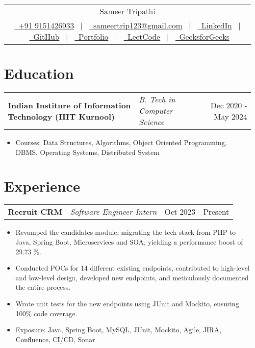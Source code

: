 \documentclass[a4paper,10pt]{article}
\makeatletter
\newenvironment{joblong}[3]
    {
    \begin{tabularx}{\linewidth}{@{}l X r@{}}
    \textbf{#1} & \textit{#2} &  #3 \\[3pt]
    \end{tabularx}
    \begin{minipage}[t]{\linewidth}
    \begin{itemize}[nosep,after=\strut, leftmargin=1em, itemsep=2pt,label=--]
    }
    {
    \end{itemize}
    \end{minipage}    
    }
\makeatother
\begin{document}
\pagestyle{empty} 


\begin{tabularx}{\linewidth}{@{} C @{}}
\Huge{Sameer Tripathi} \\[8pt]
\href{tel:+919151426933}{\ +91 9151426933} \ $|$ \
\href{mailto:sameertrip123@gmail.com}{\ sameertrip123@gmail.com} \ $|$ \
\href{https://linkedin.com/in/sameertri039}{\ LinkedIn} \ $|$ \ 
\href{https://github.com/sameertrip123}{\ GitHub} \ $|$ \ 
\href{https://sameertrip123.github.io/portfolio/}{\ Portfolio}  \ $|$ \ 
\href{https://leetcode.com/u/sameertri039/}{\ LeetCode} \ $|$ \
\href{https://www.geeksforgeeks.org/user/sameertri039/}{\ GeeksforGeeks}  \\
\end{tabularx}


\section{Education}
\vspace{-4pt}
\begin{joblong}{Indian Institure of Information Technology (IIIT Kurnool)}{B. Tech in Computer Science}{Dec 2020 - May 2024}
    \item Courses: Data Structures, Algorithms, Object Oriented Programming, DBMS, Operating Systems, Distributed System
\end{joblong}
\vspace{-16pt}

\section{Experience}
\vspace{-4pt}
\begin{joblong}{Recruit CRM}{Software Engineer Intern}{Oct 2023 - Present}
    \item Revamped the candidates module, migrating the tech stack from PHP to Java, Spring Boot, Microservices and SOA, yielding a performance boost of 29.73 \%.
    \item Conducted POCs for 14 different existing endpoints, contributed to high-level and low-level design, developed new endpoints, and meticulously documented the entire process.
    \item Wrote unit tests for the new endpoints using JUnit and Mockito, ensuring 100\% code coverage.
    \item Exposure: Java, Spring Boot, MySQL, JUnit, Mockito, Agile, JIRA, Confluence, CI/CD, Sonar
\end{joblong}
\end{document}

